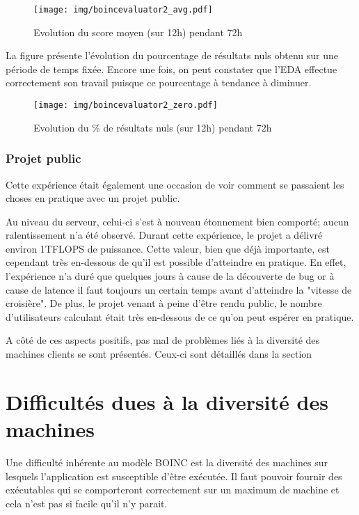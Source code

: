 \documentclass[a4paper, 11pt]{report}
\begin{document}
\begin{figure}[!h]
\centering
\texttt{[image: img/boincevaluator2\_avg.pdf]}
\caption{Evolution du score moyen (sur 12h) pendant 72h}%
\label{boincevaluator2_avg}
\end{figure}

La figure %
présente l'évolution du pourcentage de résultats nuls obtenu sur une période de temps fixée. Encore une fois, on peut constater que l'EDA effectue correctement son travail puisque ce pourcentage à tendance à diminuer.

\begin{figure}[!h]
\centering
\texttt{[image: img/boincevaluator2\_zero.pdf]}
\caption{Evolution du \% de résultats nuls (sur 12h) pendant 72h}%
\label{boincevaluator2_zero}
\end{figure}

\subsubsection{Projet public}
Cette expérience était également une occasion de voir comment se passaient les choses en pratique avec un projet public. 

Au niveau du serveur, celui-ci s'est à nouveau étonnement bien comporté; aucun ralentissement n'a été observé. Durant cette expérience, le projet a délivré environ 1TFLOPS de puissance. Cette valeur, bien que déjà importante, est cependant très en-dessous de qu'il est possible d'atteindre en pratique. En effet, l'expérience n'a duré que quelques jours à cause de la découverte de bug or à cause de latence il faut toujours un certain temps avant d'atteindre la "vitesse de croisière".  De plus, le projet venant à peine d'être rendu public, le nombre d'utilisateurs calculant était très en-dessous de ce qu'on peut espérer en pratique.

A côté de ces aspects positifs, pas mal de problèmes liés à la diversité des machines clients se sont présentés. Ceux-ci sont détaillés dans la section %

\section{Difficultés dues à la diversité des machines}
Une difficulté inhérente au modèle \textsc{BOINC} est la diversité des machines sur lesquels l'application est susceptible d'être exécutée. Il faut pouvoir fournir des exécutables qui se comporteront correctement sur un maximum de machine et cela n'est pas si facile qu'il n'y parait.
\end{document}
